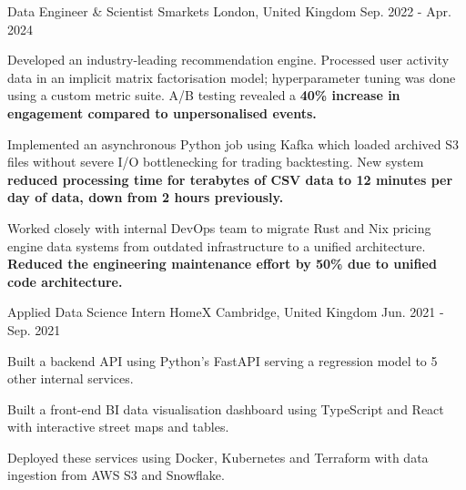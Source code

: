 \begin{cventries}
  \cventry
    {Data Engineer \& Scientist} %
    {Smarkets} %
    {London, United Kingdom} %
    {Sep. 2022 - Apr. 2024} %
    {
      \begin{cvitems} %
        \item {Developed an industry-leading recommendation engine. Processed user activity data in an implicit matrix factorisation model; hyperparameter tuning was done using a custom metric suite. A/B testing revealed a \bf{40\% increase in engagement} compared to unpersonalised events.}
        \item {Implemented an asynchronous Python job using Kafka which loaded archived S3 files without severe I/O bottlenecking for trading backtesting. New system \bf{reduced processing time for terabytes of CSV data to 12 minutes} per day of data, down from 2 hours previously.}
        \item {Worked closely with internal DevOps team to migrate Rust and Nix pricing engine data systems from outdated infrastructure to a unified architecture. \bf{Reduced the engineering maintenance effort by 50\%} due to unified code architecture.}
      \end{cvitems}
    }

  \cventry
    {Applied Data Science Intern} %
    {HomeX} %
    {Cambridge, United Kingdom} %
    {Jun. 2021 - Sep. 2021} %
    {
      \begin{cvitems} %
        \item {Built a backend API using Python's FastAPI serving a regression model to 5 other internal services.}
        \item {Built a front-end BI data visualisation dashboard using TypeScript and React with interactive street maps and tables.}
        \item {Deployed these services using Docker, Kubernetes and Terraform with data ingestion from AWS S3 and Snowflake.}
      \end{cvitems}
    }


\end{cventries}

